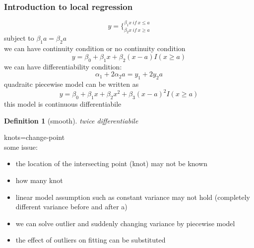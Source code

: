 \documentclass[10pt]{article}
\theoremstyle{break}
\newtheorem{defn}{Definition}[subsection]
\begin{document}
        \subsubsection{Introduction to local regression}
            $$y=\{^{\beta_1 x\  if\  x \leq a}_{\beta_2x\ if\ x\geq a}$$
            subject to $\beta_1 a=\beta_2a$\\
            we can have continuity condition or no continuity condition
            $$y=\beta_0+\beta_1x+\beta_2(x-a)I(x\geq a)$$
            we can have differentiability condition:
            $$\alpha_1+2\alpha_2 a=y_1+2y_2a$$
            quadraitc piecewise model can be written as
            $$y=\beta_0+\beta_1x+\beta_2x^2+\beta_3(x-a)^2I(x\geq a)$$
            this model is continuous differentiabile 
            \begin{defn}[smooth]
                twice differentiabile
            \end{defn}
            knots=change-point\\
            some issue:\begin{itemize}
                \item the location of the intersecting point (knot) may not be known 
                \item how many knot
                \item linear model assumption such as constant variance may not hold (completely different variance before and after a) 
                \item we can solve outlier and suddenly changing variance by piecewise model
                \item the effect of outliers on fitting can be substituted 
            \end{itemize}
\end{document}

